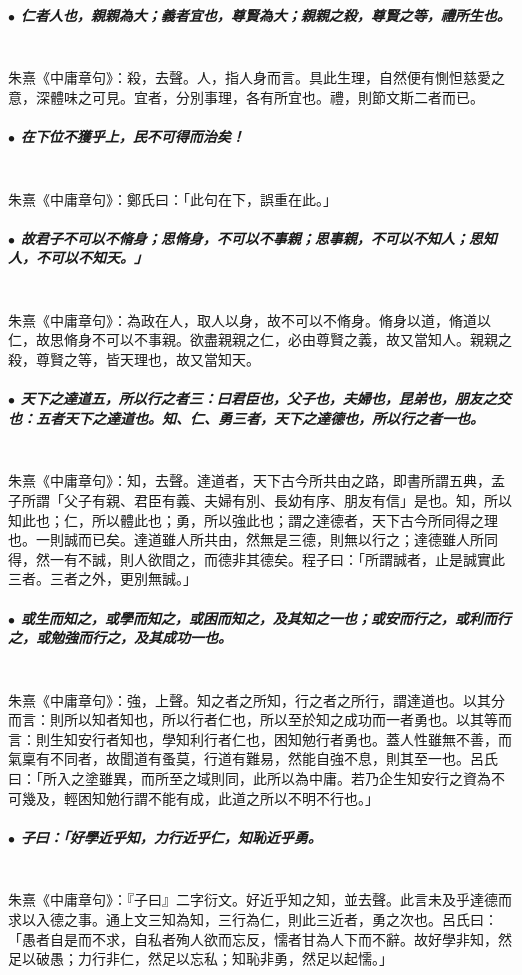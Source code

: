 \documentclass[hyperref, UTF8, 12pt, a4paper]{ctexrep}
\begin{document}
\subparagraph{$\bullet$ 仁者人也，親親為大；義者宜也，尊賢為大；親親之殺，尊賢之等，禮所生也。} ~\\

朱熹《中庸章句》：殺，去聲。人，指人身而言。具此生理，自然便有惻怛慈愛之意，深體味之可見。宜者，分別事理，各有所宜也。禮，則節文斯二者而已。

\subparagraph{$\bullet$ 在下位不獲乎上，民不可得而治矣！} ~\\

朱熹《中庸章句》：鄭氏曰：「此句在下，誤重在此。」

\subparagraph{$\bullet$ 故君子不可以不脩身；思脩身，不可以不事親；思事親，不可以不知人；思知人，不可以不知天。」} ~\\

朱熹《中庸章句》：為政在人，取人以身，故不可以不脩身。脩身以道，脩道以仁，故思脩身不可以不事親。欲盡親親之仁，必由尊賢之義，故又當知人。親親之殺，尊賢之等，皆天理也，故又當知天。

\subparagraph{$\bullet$ 天下之達道五，所以行之者三：曰君臣也，父子也，夫婦也，昆弟也，朋友之交也：五者天下之達道也。知、仁、勇三者，天下之達德也，所以行之者一也。} ~\\

朱熹《中庸章句》：知，去聲。達道者，天下古今所共由之路，即書所謂五典，孟子所謂「父子有親、君臣有義、夫婦有別、長幼有序、朋友有信」是也。知，所以知此也；仁，所以體此也；勇，所以強此也；謂之達德者，天下古今所同得之理也。一則誠而已矣。達道雖人所共由，然無是三德，則無以行之；達德雖人所同得，然一有不誠，則人欲間之，而德非其德矣。程子曰：「所謂誠者，止是誠實此三者。三者之外，更別無誠。」

\subparagraph{$\bullet$ 或生而知之，或學而知之，或困而知之，及其知之一也；或安而行之，或利而行之，或勉強而行之，及其成功一也。} ~\\

朱熹《中庸章句》：強，上聲。知之者之所知，行之者之所行，謂達道也。以其分而言：則所以知者知也，所以行者仁也，所以至於知之成功而一者勇也。以其等而言：則生知安行者知也，學知利行者仁也，困知勉行者勇也。蓋人性雖無不善，而氣稟有不同者，故聞道有蚤莫，行道有難易，然能自強不息，則其至一也。呂氏曰：「所入之塗雖異，而所至之域則同，此所以為中庸。若乃企生知安行之資為不可幾及，輕困知勉行謂不能有成，此道之所以不明不行也。」

\subparagraph{$\bullet$ 子曰：「好學近乎知，力行近乎仁，知恥近乎勇。} ~\\

朱熹《中庸章句》：『子曰』二字衍文。好近乎知之知，並去聲。此言未及乎達德而求以入德之事。通上文三知為知，三行為仁，則此三近者，勇之次也。呂氏曰：「愚者自是而不求，自私者殉人欲而忘反，懦者甘為人下而不辭。故好學非知，然足以破愚；力行非仁，然足以忘私；知恥非勇，然足以起懦。」
\end{document}
